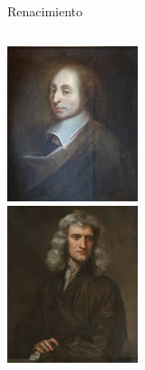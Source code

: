\documentclass [xcolor=svgnames, t] {beamer}
\begin{document}
\begin{frame}{Renacimiento}
\begin{columns}
\begin{center}
\includegraphics[width=0.7\textwidth]{pasca}\\
\includegraphics[width=0.7\textwidth]{new}
\end{center}
\end{columns}
\end{frame}
\end{document}
